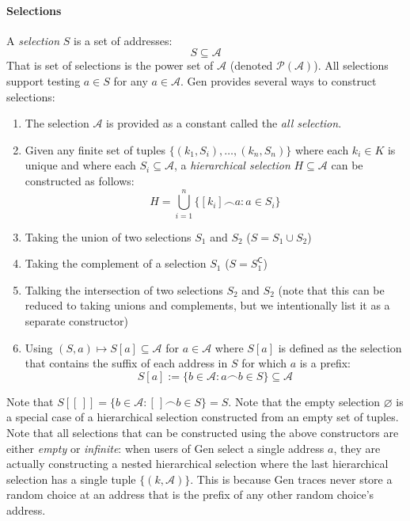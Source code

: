 \documentclass{article}
\begin{document}
\paragraph{Selections}
A \emph{selection} $S$ is a set of addresses:
\[
    S \subseteq \mathcal{A}
\]
That is set of selections is the power set of $\mathcal{A}$ (denoted $\mathcal{P}(\mathcal{A})$).
All selections support testing $a \in S$ for any $a \in \mathcal{A}$.
Gen provides several ways to construct selections:
\begin{enumerate}
\item The selection $\mathcal{A}$ is provided as a constant called the \emph{all selection}.
\item Given any finite set of tuples $\{(k_1, S_i), \ldots, (k_n, S_n)\}$ where each $k_i \in K$ is unique and where each $S_i \subseteq \mathcal{A}$,
a \emph{hierarchical selection} $H \subseteq \mathcal{A}$ can be constructed as follows:
\[
    H = \bigcup_{i=1}^n \{[k_i] \frown a : a \in S_i\}
\]
\item Taking the union of two selections $S_1$ and $S_2$ ($S = S_1 \cup S_2$)
\item Taking the complement of a selection $S_1$ ($S = S_1^{\mathsf{C}}$)
\item Talking the intersection of two selections $S_2$ and $S_2$ (note that this can be reduced to taking unions and complements, but we intentionally list it as a separate constructor)
\item Using $(S, a) \mapsto S[a] \subseteq \mathcal{A}$ for $a \in \mathcal{A}$ where $S[a]$ is defined as
the selection that contains the suffix of each address in $S$ for which $a$ is a prefix:
\[
    S[a] := \{b \in \mathcal{A} : a \frown b \in S\} \subseteq \mathcal{A} 
\]
\end{enumerate}
Note that $S[[\,]] = \{b \in \mathcal{A} : [\,] \frown b \in S\} = S$.
Note that the empty selection $\varnothing$ is a special case of a hierarchical selection constructed from an empty set of tuples.
Note that all selections that can be constructed using the above constructors are either \emph{empty} or \emph{infinite}:
when users of Gen select a single address $a$, they are actually constructing a nested hierarchical selection where the last hierarchical selection has a single tuple $\{(k, \mathcal{A})\}$.
This is because Gen traces never store a random choice at an address that is the prefix of any other random choice's address.
\end{document}
